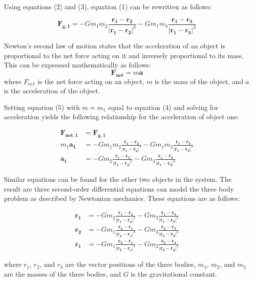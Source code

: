 \documentclass{article}
\begin{document}
Using equations (2) and (3), equation (1) can be rewritten as follows:

\begin{equation}
    \bm{F_{g,1}} = -Gm_1 m_2\frac{\bm{r_1} - \bm{r_2}}{|\bm{r_1} - \bm{r_2}|^3}-Gm_1 m_3\frac{\bm{r_1} - \bm{r_3}}{|\bm{r_1} - \bm{r_3}|^3}
\end{equation}


Newton's second law of motion states that the acceleration of an object is proportional to the net force acting on it and inversely proportional to its mass. This can be expressed mathematically as follows:
\begin{equation}
    \bm{F_{net}} = m\bm{a}
\end{equation}
where $F_{net}$ is the net force acting on an object, $m$ is the mass of the object, and $a$ is the acceleration of the object.

Setting equation (5) with $m=m_1$ equal to equation (4) and solving for acceleration yields the following relationship for the acceleration of object one:

\begin{align}
    \bm{F_{net,1}} &= \bm{F_{g,1}} \nonumber \\
    m_1\bm{a_1} &= -Gm_1 m_2\frac{\bm{r_1} - \bm{r_2}}{|\bm{r_1} - \bm{r_2}|^3}-Gm_1 m_3\frac{\bm{r_1} - \bm{r_3}}{|\bm{r_1} - \bm{r_3}|^3}\nonumber \\
    \bm{a_1} &= -Gm_2\frac{\bm{r_1} - \bm{r_2}}{|\bm{r_1} - \bm{r_2}|^3}-Gm_3\frac{\bm{r_1} - \bm{r_3}}{|\bm{r_1} - \bm{r_3}|^3}
\end{align}

Similar equations can be found for the other two objects in the system.  The result are three second-order differential equations can model the three body problem as described by Newtonian mechanics. These equations are as follows:

\begin{align}
    \ddot{\bm{r_1}} &= -Gm_2\frac{\bm{r_1}-\bm{r_2}}{|\bm{r_1}-\bm{r_2}|^3}-Gm_3\frac{\bm{r_1}-\bm{r_3}}{|\bm{r_1}-\bm{r_3}|^3}\\
    \ddot{\bm{r_2}} &= -Gm_1\frac{\bm{r_2}-\bm{r_1}}{|\bm{r_2}-\bm{r_1}|^3}-Gm_3\frac{\bm{r_2}-\bm{r_3}}{|\bm{r_2}-\bm{r_3}|^3}\\
    \ddot{\bm{r_1}} &= -Gm_1\frac{\bm{r_3}-\bm{r_1}}{|\bm{r_3}-\bm{r_1}|^3}-Gm_2\frac{\bm{r_3}-\bm{r_2}}{|\bm{r_3}-\bm{r_2}|^3}
\end{align}

where $r_1$, $r_2$, and $r_3$ are the vector positions of the three bodies, $m_1$, $m_2$, and $m_3$ are the masses of the three bodies, and $G$ is the gravitational constant.
\end{document}
